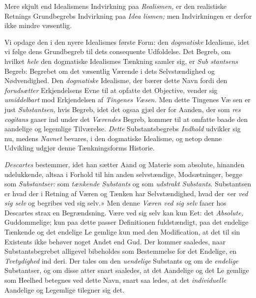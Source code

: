 Mere skjult end Idealismens Indvirkning paa \emph{Realismen,}
er den realistiske Retnings Grundbegrebs Indvirkning paa \emph{Idea\-%
lismen;} men Indvirkningen er derfor ikke mindre væsentlig.

Vi opdage den i den nyere Idealismes første Form: den
\emph{dogmatiske} Idealisme, idet vi følge dens Grundbegreb til
dets consequente Udfoldelse. Det Begreb, om hvilket \emph{hele}
den dogmatiske Idealismes Tænkning samler sig, er \emph{Sub\-%
stantsens} Begreb: Begrebet om det væsentlig Værende i dets
Selvstændighed og Nødvendighed. Den \emph{dogmatiske} Idealisme,
der bærer dette Navn fordi den \emph{forudsætter} Erkjendelsens
Evne til at opfatte det Objective, vender sig \emph{umiddelbart} mod
Erkjendelsen af \emph{Tingenes Væsen.} Men dette Tingenes Væ\-%
sen er just \emph{Substantsen,} hvis Begreb, idet det ogsaa gjæl\-%
der for Aanden, der som \emph{res cogitans} gaaer ind under
det \emph{Værendes} Begreb, kommer til at omfatte baade den
aandelige og legemlige Tilværelse. \emph{Dette} Substantsbegrebs
\emph{Indhold} udvikler sig nu, medens \emph{Navnet} bevares, i den
dogmatiske Idealisme, og netop denne Udvikling udgjør denne
Tænkningsforms Historie.

\emph{Descartes} bestemmer, idet han sætter Aand og Materie
som absolute, hinanden udelukkende, altsaa i Forhold til hin\-%
anden selvstændige, Modsætninger, begge som \emph{Substantser:}
som \emph{tænkende Substants} og som \emph{udstrakt Substants.}
Substantsen er hvad der i Retning af Væren og Tænken har
Selvstændighed, hvad der «er \emph{ved sig selv} og begribes ved sig
selv.» Men denne \emph{Væren ved sig selv} faaer hos Descartes
strax en Begrændsning. Være ved sig selv kan kun Eet: det
\emph{Absolute,} Guddommelige; kun paa dette passer Definitionen
fuldstændigt, paa det endelige Tænkende og det endelige Le\-%
gemlige kun med den Modification, at det til sin Existents
ikke behøver noget Andet end Gud. Der kommer saaledes,
naar Substantsbegrebet alligevel bibeholdes som Bestemmelse
for det Endelige, en \emph{Tvetydighed} ind deri. Der tales om
den \emph{uendelige} Substants og om de \emph{endelige} Substantser,
og om disse atter snart saaledes, at det Aandelige og det Le\-%
gemlige som Heelhed betegnes ved dette Navn, snart saa\-%
ledes, at det \emph{individuelle} Aandelige og Legemlige tilegner
sig det.

